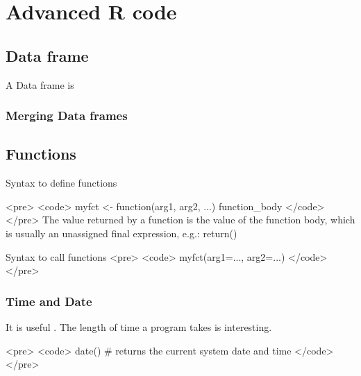 



\newpage
\chapter{Advanced R code}
\section{Data frame}
A Data frame is
\subsection{Merging Data frames}

\section{Functions}
Syntax to define functions

<pre>
<code>
myfct <- function(arg1, arg2, ...) { function_body }
</code>
</pre>
The value returned by a function is the value of the function body, which is usually an unassigned final expression, e.g.: return()

Syntax to call functions
<pre>
<code>
myfct(arg1=..., arg2=...)
</code>
</pre>


\subsection{Time and Date}
It is useful . The length of time a program takes is interesting.


<pre>
<code>
date() # returns the current system date and time
</code>
</pre>



